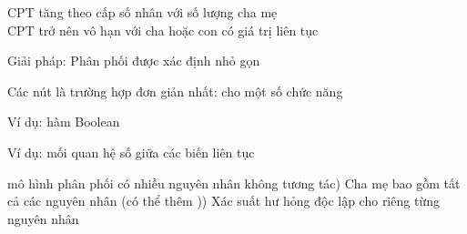\documentclass{article}
\begin{document}
\begin{huge}
\vspace*{0.1in}

\textwidth
{}



\vspace*{0.1in}

\textwidth
{}




CPT tăng theo cấp số nhân với số lượng cha mẹ\\
CPT trở nên vô hạn với cha hoặc con có giá trị liên tục

Giải pháp: Phân phối  được xác định nhỏ gọn

Các nút  là trường hợp đơn giản nhất:\al
    cho một số chức năng 

Ví dụ: hàm Boolean\al

Ví dụ: mối quan hệ số giữa các biến liên tục
\mat{\[
  \frac{\partial Level}{\partial t} = \mbox{ inflow + precipitation 
                                            - outflow - evaporation}
\]}



 mô hình phân phối có nhiều nguyên nhân không tương tác) Cha mẹ  bao gồm tất cả các nguyên nhân (có thể thêm )) Xác suất hư hỏng độc lập  cho riêng từng nguyên nhân \nl


\end{huge}
\end{document}
